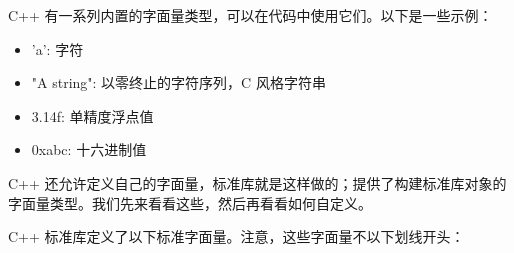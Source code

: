 
C++ 有一系列内置的字面量类型，可以在代码中使用它们。以下是一些示例：

\begin{itemize}
\item
'a': 字符

\item
"A string": 以零终止的字符序列，C 风格字符串

\item
3.14f: 单精度浮点值

\item
0xabc: 十六进制值
\end{itemize}

C++ 还允许定义自己的字面量，标准库就是这样做的；提供了构建标准库对象的字面量类型。我们先来看看这些，然后再看看如何自定义。


C++ 标准库定义了以下标准字面量。注意，这些字面量不以下划线开头：

